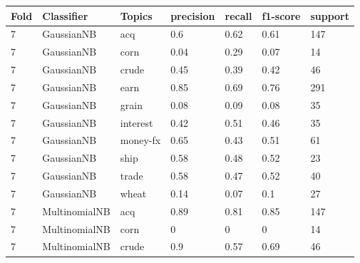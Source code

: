 \documentclass{article}
\begin{document}
\begin{table}[h]
\begin{tabular}{lllllll}
\textbf{Fold} & \textbf{Classifier}    & \textbf{Topics} & \textbf{precision} & \textbf{recall} & \textbf{f1-score} & \textbf{support} \\ \hline
7             & GaussianNB             & acq             & 0.6                & 0.62            & 0.61              & 147              \\
7             & GaussianNB             & corn            & 0.04               & 0.29            & 0.07              & 14               \\
7             & GaussianNB             & crude           & 0.45               & 0.39            & 0.42              & 46               \\
7             & GaussianNB             & earn            & 0.85               & 0.69            & 0.76              & 291              \\
7             & GaussianNB             & grain           & 0.08               & 0.09            & 0.08              & 35               \\
7             & GaussianNB             & interest        & 0.42               & 0.51            & 0.46              & 35               \\
7             & GaussianNB             & money-fx        & 0.65               & 0.43            & 0.51              & 61               \\
7             & GaussianNB             & ship            & 0.58               & 0.48            & 0.52              & 23               \\
7             & GaussianNB             & trade           & 0.58               & 0.47            & 0.52              & 40               \\
7             & GaussianNB             & wheat           & 0.14               & 0.07            & 0.1               & 27               \\
7             & MultinomialNB          & acq             & 0.89               & 0.81            & 0.85              & 147              \\
7             & MultinomialNB          & corn            & 0                  & 0               & 0                 & 14               \\
7             & MultinomialNB          & crude           & 0.9                & 0.57            & 0.69              & 46               \\

\end{tabular}
\end{table}
\end{document}

